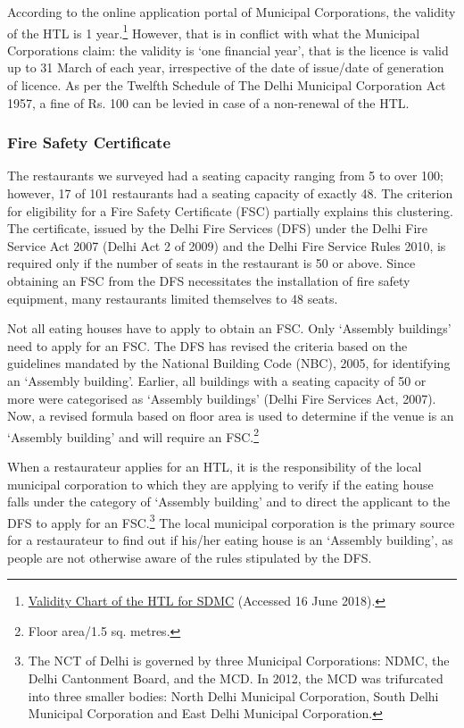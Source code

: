 \documentclass[a4paper, 12pt]{article}
\begin{document}
                    According to the online application portal of Municipal Corporations, the validity of the HTL is 1 year.\footnote{\href{https://bit.ly/2Qzd92r}{Validity Chart of the HTL for SDMC} (Accessed 16 June 2018).} However, that is in conflict with what the Municipal Corporations claim: the validity is ‘one financial year’, that is the licence is valid up to 31 March of each year, irrespective of the date of issue/date of generation of licence. As per the Twelfth Schedule of The Delhi Municipal Corporation Act 1957, a fine of Rs. 100 can be levied in case of a non-renewal of the HTL. %
  
     
		\subsubsection{Fire Safety Certificate}
		The restaurants we surveyed had a seating capacity ranging from 5 to over 100; however, 17 of 101 restaurants had a seating capacity of exactly 48. The criterion for eligibility for a Fire Safety Certificate (FSC) partially explains this clustering. The 
certificate, issued by the Delhi Fire Services (DFS) under the Delhi Fire Service Act 2007 (Delhi Act 2 of 2009) and the Delhi Fire Service Rules 2010, is required only if the number of seats in the restaurant is 50 or above. Since obtaining an FSC from the DFS 
necessitates the installation of fire safety equipment, many restaurants limited themselves to 48 seats. %
		
		Not all eating houses have to apply to obtain an FSC. Only ‘Assembly buildings’ need to apply for an FSC. The DFS has revised the criteria based on the guidelines mandated by the National Building Code (NBC), 2005, for identifying an ‘Assembly 
building’. Earlier, all buildings with a seating capacity of 50 or more were categorised as ‘Assembly buildings’ (Delhi Fire Services Act, 2007). Now, a revised formula based on floor area is used to determine if the venue is an ‘Assembly building’ and will require an 
FSC.\footnote{Floor area/1.5 sq. metres.} 
		
		When a restaurateur applies for an HTL, it is the responsibility of the local municipal corporation to which they are applying to verify if the eating house falls under the category of ‘Assembly building’ and to direct the applicant to the DFS to apply for an 
FSC.\footnote{The NCT of Delhi is governed by three Municipal Corporations: NDMC, the Delhi Cantonment Board, and the MCD. In 2012, the MCD was trifurcated into three smaller bodies: North Delhi Municipal Corporation, South Delhi Municipal Corporation 
and East Delhi Municipal Corporation.} The local municipal corporation is the primary source for a restaurateur to find out if his/her eating house is an ‘Assembly building’, as people are not otherwise aware of the rules stipulated by the DFS. %
		
\end{document}
